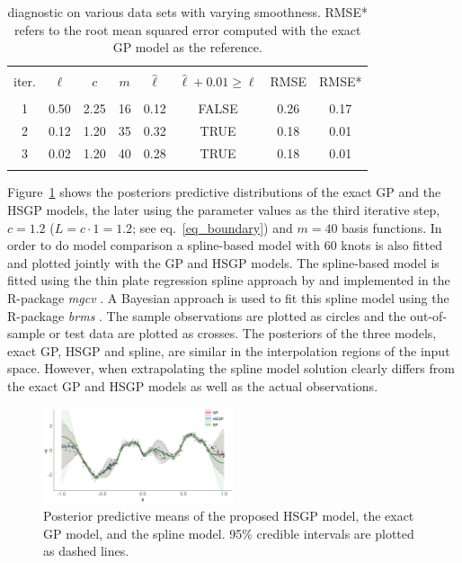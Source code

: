 \begin{table}
\centering
\setlength{\tabcolsep}{4pt}
\begin{tabular}{cccccccc}
\arrayrulecolor{gray}\hline \\[-3mm]
iter. & $\ell$ & $c$ & $m$ & $\hat{\ell}$ & $\hat{\ell} + 0.01 \geq \ell$ & RMSE & RMSE* \\ 
\arrayrulecolor{lightgray}\hline \\[-1mm]
 1 & 0.50 & 2.25 & 16 & 0.12 & FALSE & 0.26 & 0.17 \\
 2 & 0.12 & 1.20 & 35 & 0.32 & TRUE & 0.18 & 0.01 \\
 3 & 0.02 & 1.20 & 40 & 0.28 & TRUE & 0.18 & 0.01 \\[1mm]
\arrayrulecolor{gray}\hline
\end{tabular}
\caption{diagnostic on various data sets with varying smoothness. RMSE* refers to the root mean squared error computed with the exact GP model as the reference.}
  \label{tab_caseI}
\end{table}

Figure~\ref{fig11_Posteriors_exI} shows the posteriors predictive distributions of the exact GP and the HSGP models, the later using the parameter values as the third iterative step, $c=1.2$ ($L=c\cdot 1= 1.2$; see eq.~\eqref{eq_boundary}) and $m=40$ basis functions. In order to do model comparison a spline-based model with 60 knots is also fitted and plotted jointly with the GP and HSGP models. The spline-based model is fitted using the thin plate regression spline approach by \citet{wood2003thin} and implemented in the R-package \textit{mgcv} \citep{wood2011mgcv}. A Bayesian approach is used to fit this spline model using the R-package \textit{brms} \citep{burkner2017brms}. The sample observations are plotted as circles and the out-of-sample or test data are plotted as crosses. The posteriors of the three models, exact GP, HSGP and spline, are similar in the interpolation regions of the input space. However, when extrapolating the spline model solution clearly differs from the exact GP and HSGP models as well as the actual observations. 

\begin{figure}
\centering
\includegraphics[width=0.5\textwidth]{fig11_Posteriors_exI.png}
\caption{Posterior predictive means of the proposed HSGP model, the exact GP model, and the spline model. 95\% credible intervals are plotted as dashed lines.}
  \label{fig11_Posteriors_exI}
\end{figure}


